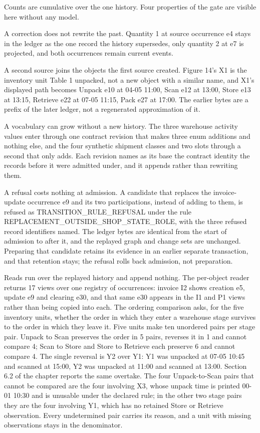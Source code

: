 Counts are cumulative over the one history. Four properties of the gate are visible here without any model.

A correction does not rewrite the past. Quantity 1 at source occurrence e4 stays in the ledger as the one record the history supersedes, only quantity 2 at e7 is projected, and both occurrences remain current events.

A second source joins the objects the first source created. Figure 14's X1 is the inventory unit Table 1 unpacked, not a new object with a similar name, and X1's displayed path becomes Unpack e10 at 04-05 11:00, Scan e12 at 13:00, Store e13 at 13:15, Retrieve e22 at 07-05 11:15, Pack e27 at 17:00. The earlier bytes are a prefix of the later ledger, not a regenerated approximation of it.

A vocabulary can grow without a new history. The three warehouse activity values enter through one contract revision that makes three enum additions and nothing else, and the four synthetic shipment classes and two slots through a second that only adds. Each revision names as its base the contract identity the records before it were admitted under, and it appends rather than rewriting them.

A refusal costs nothing at admission. A candidate that replaces the invoice-update occurrence e9 and its two participations, instead of adding to them, is refused as TRANSITION\_\allowbreak{}RULE\_\allowbreak{}REFUSAL under the rule REPLACEMENT\_\allowbreak{}OUTSIDE\_\allowbreak{}SHOP\_\allowbreak{}STATE\_\allowbreak{}ROLE, with the three refused record identifiers named. The ledger bytes are identical from the start of admission to after it, and the replayed graph and change sets are unchanged. Preparing that candidate retains its evidence in an earlier separate transaction, and that retention stays; the refusal rolls back admission, not preparation.

Reads run over the replayed history and append nothing. The per-object reader returns 17 views over one registry of occurrences: invoice I2 shows creation e5, update e9 and clearing e30, and that same e30 appears in the I1 and P1 views rather than being copied into each. The ordering comparison asks, for the five inventory units, whether the order in which they enter a warehouse stage survives to the order in which they leave it. Five units make ten unordered pairs per stage pair. Unpack to Scan preserves the order in 5 pairs, reverses it in 1 and cannot compare 4; Scan to Store and Store to Retrieve each preserve 6 and cannot compare 4. The single reversal is Y2 over Y1: Y1 was unpacked at 07-05 10:45 and scanned at 15:00, Y2 was unpacked at 11:00 and scanned at 13:00. Section 6.2 of the chapter reports the same overtake. The four Unpack-to-Scan pairs that cannot be compared are the four involving X3, whose unpack time is printed 00-01 10:30 and is unusable under the declared rule; in the other two stage pairs they are the four involving Y1, which has no retained Store or Retrieve observation. Every undetermined pair carries its reason, and a unit with missing observations stays in the denominator.

